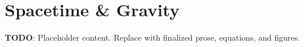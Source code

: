 \section{Spacetime \& Gravity}
\label{sec:spacetime-gravity}

\textbf{TODO}: Placeholder content. Replace with finalized prose, equations, and figures.

